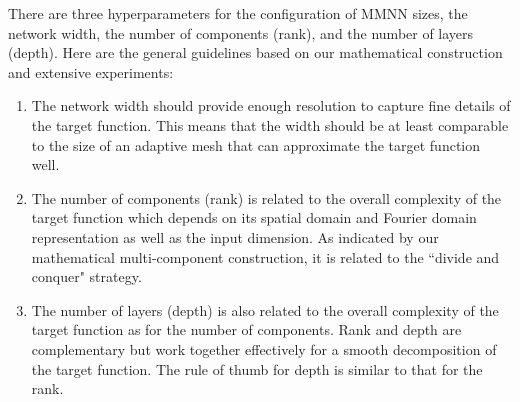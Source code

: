 \documentclass[review,hidelinks,onefignum,onetabnum]{siamart250211}
\begin{document}
    There are three hyperparameters for the configuration of MMNN sizes, the network width, the number of components (rank), and the number of layers (depth). Here are the general guidelines based on our mathematical construction and extensive experiments:
    \begin{enumerate}
   \item The network width should provide enough resolution to capture fine details of the target function. This means that the width should be at least comparable to the size of an adaptive mesh that can approximate the target function well. 
\item The number of components (rank) is related to the overall complexity of the target function which depends on its spatial domain and Fourier domain representation as well as the input dimension. As indicated by our mathematical multi-component construction, it is related to the ``divide and conquer" strategy. 
\item The number of layers (depth) is also related to the overall complexity of the target function as for the number of components. Rank and depth are complementary but work together effectively for a smooth decomposition of the target function. The rule of thumb for depth is similar to that for the rank. 
    \end{enumerate}
\end{document}
